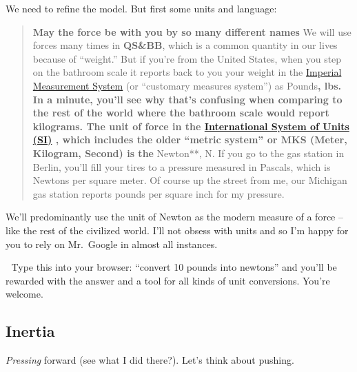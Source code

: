 \documentclass[
  letterpaper,
  DIV=11,
  numbers=noendperiod,
  oneside]{scrreprt}
\begin{document}
We need to refine the model. But first some units and language:

\begin{quote}
\textbf{May the force be with you by so many different names} We will
use forces many times in \textbf{QS\&BB}, which is a common quantity in
our lives because of ``weight.'' But if you're from the United States,
when you step on the bathroom scale it reports back to you your weight
in the
\href{https://en.wikipedia.org/wiki/Imperial_and_US_customary_measurement_systems}{Imperial
Measurement System} (or ``customary measures system'') as
Pounds\textbf{, lbs. In a minute, you'll see why that's confusing when
comparing to the rest of the world where the bathroom scale would report
kilograms. The unit of force in the
\href{https://en.wikipedia.org/wiki/International_System_of_Units}{International
System of Units (SI)} , which includes the older ``metric system'' or
MKS (Meter, Kilogram, Second) is the }Newton**, N. If you go to the gas
station in Berlin, you'll fill your tires to a pressure measured in
Pascals, which is Newtons per square meter. Of course up the street from
me, our Michigan gas station reports pounds per square inch for my
pressure.
\end{quote}

We'll predominantly use the unit of Newton as the modern measure of a
force -- like the rest of the civilized world. I'll not obsess with
units and so I'm happy for you to rely on Mr.~Google in almost all
instances.

\begin{tcolorbox}[enhanced jigsaw, colbacktitle=quarto-callout-tip-color!10!white, rightrule=.15mm, toptitle=1mm, arc=.35mm, breakable, left=2mm, title={Tip}, colframe=quarto-callout-tip-color-frame, bottomrule=.15mm, colback=white, titlerule=0mm, leftrule=.75mm, toprule=.15mm, coltitle=black, opacityback=0, opacitybacktitle=0.6, bottomtitle=1mm]

🔐 Type this into your browser: ``convert 10 pounds into newtons'' and
you'll be rewarded with the answer and a tool for all kinds of unit
conversions. You're welcome.

\end{tcolorbox}

\subsection{Inertia}\label{inertia}

\emph{Pressing} forward (see what I did there?). Let's think about
pushing.
\end{document}
